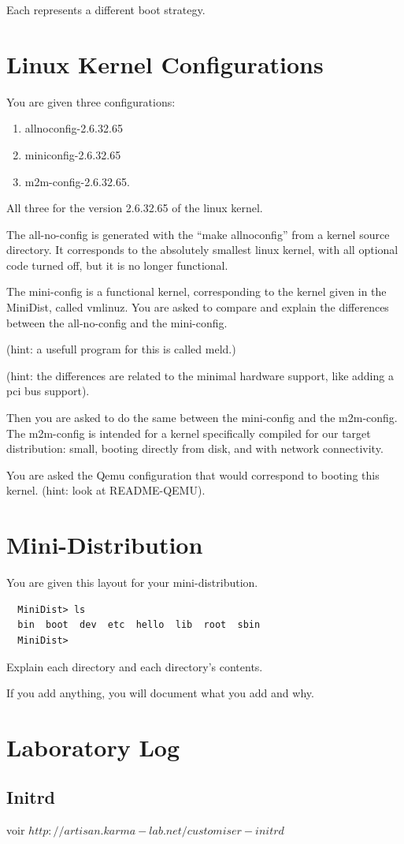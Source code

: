 \documentclass[10]{article}
\begin{document}
Each represents a different boot strategy.

\section{Linux Kernel Configurations}
\label{sec:linux:kernel:config}

You are given three configurations:

\begin{enumerate}
\item allnoconfig-2.6.32.65
\item miniconfig-2.6.32.65
\item m2m-config-2.6.32.65.
\end{enumerate}

All three for the version 2.6.32.65 of the linux kernel.

The all-no-config is generated with the ``make allnoconfig''
from a kernel source directory. It corresponds to the absolutely
smallest linux kernel, with all optional code turned off,
but it is no longer functional.

The mini-config is a functional kernel, corresponding to the
kernel given in the MiniDist, called vmlinuz. You are asked
to compare and explain the differences between the all-no-config
and the mini-config. 

\noindent (hint: a usefull program for this is called meld.)

\noindent (hint: the differences are related to the minimal
hardware support, like adding a pci bus support).

Then you are asked to do the same between the mini-config
and the m2m-config. The m2m-config is intended for a kernel
specifically compiled for our target distribution: small,
booting directly from disk, and with network connectivity.

You are asked the Qemu configuration that would correspond
to booting this kernel. (hint: look at README-QEMU).


\section{Mini-Distribution}

You are given this layout for your mini-distribution.
{\em\small 
\begin{verbatim}
  MiniDist> ls
  bin  boot  dev  etc  hello  lib  root  sbin
  MiniDist>
\end{verbatim}
}

Explain each directory and each directory's contents.

If you add anything, you will document what you add and why.

\section{Laboratory Log}
 \subsection{Initrd}
 voir $http://artisan.karma-lab.net/customiser-initrd$
\end{document}
